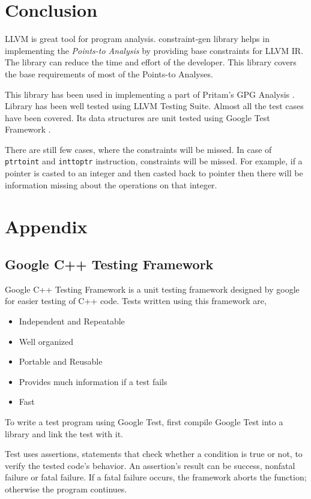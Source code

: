 \documentclass[a4paper,12pt]{report}
\begin{document}
\chapter{Conclusion}
LLVM is great tool for program analysis. 
constraint-gen library helps in implementing the \textit{Points-to Analysis} by
providing base constraints for LLVM IR. The library can reduce the time and effort
of the developer. This library covers the base requirements of most of the
Points-to Analyses.

This library has been used in implementing a part of Pritam's GPG Analysis
\cite{Pritams}. Library has been well tested using LLVM Testing Suite.
Almost all the test cases have been covered. Its data structures are unit
tested using Google Test Framework \cite{Gtest}.

There are still few cases, where the constraints will be missed.
In case of \texttt{ptrtoint} and \texttt{inttoptr} instruction, constraints
will be missed. For example, if a pointer is casted to an integer and then casted
back to pointer then there will be information missing about the operations on that
integer.

\chapter{Appendix}
\appendix
\section{Google C++ Testing Framework}
Google C++ Testing Framework \cite{Gtest} is a unit testing framework designed by google for easier
testing of C++ code. Tests written using this framework are,

\begin{itemize}
    \item Independent and Repeatable
    \item Well organized
    \item Portable and Reusable
    \item Provides much information if a test fails
    \item Fast
\end{itemize}

To write a test program using Google Test, first compile Google Test
into a library and link the test with it.

Test uses assertions, statements that check whether a condition is true or not,
to verify the tested code's behavior. An assertion's result can be success, nonfatal
failure or fatal failure. If a fatal failure occurs, the framework aborts the function;
otherwise the program continues.
\end{document}
